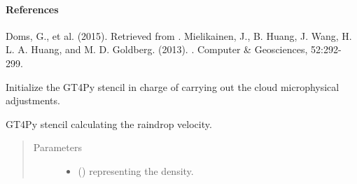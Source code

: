 \documentclass[letterpaper,10pt,english]{sphinxmanual}
\begin{document}
\begin{fulllineitems}
\begin{fulllineitems}
\paragraph{References}

Doms, G., et al. (2015).  Retrieved from .              Mielikainen, J., B. Huang, J. Wang, H. L. A. Huang, and M. D. Goldberg. (2013).                         . Computer \& Geosciences, 52:292-299.

\end{fulllineitems}


\begin{fulllineitems}
\label{\detokenize{api:tasmania.parameterizations.adjustment_microphysics_kessler_wrf.AdjustmentMicrophysicsKesslerWRF._stencil_adjustment_initialize}}
Initialize the GT4Py stencil in charge of carrying out the cloud microphysical adjustments.

\end{fulllineitems}


\begin{fulllineitems}
\label{\detokenize{api:tasmania.parameterizations.adjustment_microphysics_kessler_wrf.AdjustmentMicrophysicsKesslerWRF._stencil_raindrop_fall_velocity_defs}}
GT4Py stencil calculating the raindrop velocity.
\begin{quote}\begin{description}
\item[{Parameters}] \leavevmode\begin{itemize}
\item {} 
 () \textendash{}  representing the density.


\end{itemize}
\end{description}
\end{quote}
\end{fulllineitems}
\end{fulllineitems}
\end{document}
